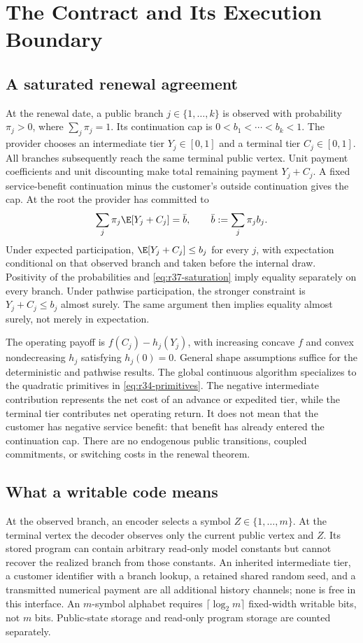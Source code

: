 \section{The Contract and Its Execution Boundary}\label{sec:r37-institution}
\subsection{A saturated renewal agreement}
At the renewal date, a public branch $j\in\{1,\ldots,k\}$ is observed with probability $\pi_j>0$, where $\sum_j\pi_j=1$. Its continuation cap is $0<b_1<\cdots<b_k<1$. The provider chooses an intermediate tier $Y_j\in[0,1]$ and a terminal tier $C_j\in[0,1]$. All branches subsequently reach the same terminal public vertex. Unit payment coefficients and unit discounting make total remaining payment $Y_j+C_j$. A fixed service-benefit continuation minus the customer's outside continuation gives the cap. At the root the provider has committed to
\begin{equation}\label{eq:r37-saturation}
 \sum_j\pi_j\E[Y_j+C_j]=\bar b,
 \qquad \bar b:=\sum_j\pi_jb_j.
\end{equation}
Under expected participation, $\E[Y_j+C_j]\leq b_j$ for every $j$, with expectation conditional on that observed branch and taken before the internal draw. Positivity of the probabilities and \eqref{eq:r37-saturation} imply equality separately on every branch. Under pathwise participation, the stronger constraint is $Y_j+C_j\leq b_j$ almost surely. The same argument then implies equality almost surely, not merely in expectation.

The operating payoff is $f(C_j)-h_j(Y_j)$, with increasing concave $f$ and convex nondecreasing $h_j$ satisfying $h_j(0)=0$. General shape assumptions suffice for the deterministic and pathwise results. The global continuous algorithm specializes to the quadratic primitives in \eqref{eq:r34-primitives}. The negative intermediate contribution represents the net cost of an advance or expedited tier, while the terminal tier contributes net operating return. It does not mean that the customer has negative service benefit: that benefit has already entered the continuation cap. There are no endogenous public transitions, coupled commitments, or switching costs in the renewal theorem.

\subsection{What a writable code means}
At the observed branch, an encoder selects a symbol $Z\in\{1,\ldots,m\}$. At the terminal vertex the decoder observes only the current public vertex and $Z$. Its stored program can contain arbitrary read-only model constants but cannot recover the realized branch from those constants. An inherited intermediate tier, a customer identifier with a branch lookup, a retained shared random seed, and a transmitted numerical payment are all additional history channels; none is free in this interface. An $m$-symbol alphabet requires $\lceil\log_2m\rceil$ fixed-width writable bits, not $m$ bits. Public-state storage and read-only program storage are counted separately.

